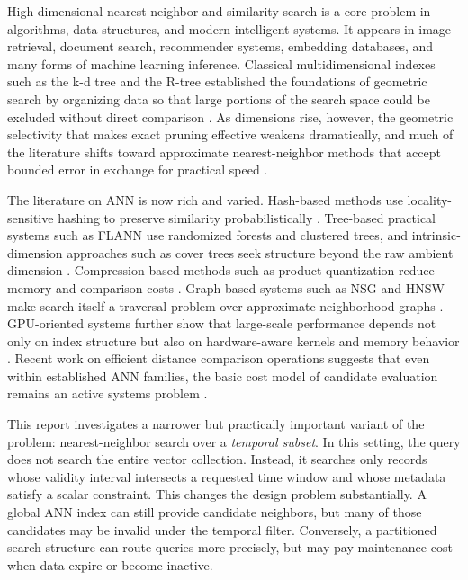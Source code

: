 \documentclass[sigconf,nonacm]{acmart}
\begin{document}
High-dimensional nearest-neighbor and similarity search is a core problem in algorithms, data structures, and modern intelligent systems. It appears in image retrieval, document search, recommender systems, embedding databases, and many forms of machine learning inference. Classical multidimensional indexes such as the k-d tree and the R-tree established the foundations of geometric search by organizing data so that large portions of the search space could be excluded without direct comparison \cite{bentley1975,guttman1984}. As dimensions rise, however, the geometric selectivity that makes exact pruning effective weakens dramatically, and much of the literature shifts toward approximate nearest-neighbor methods that accept bounded error in exchange for practical speed \cite{indyk1998,gionis1999,andoni2018}.

The literature on ANN is now rich and varied. Hash-based methods use locality-sensitive hashing to preserve similarity probabilistically \cite{indyk1998,gionis1999}. Tree-based practical systems such as FLANN use randomized forests and clustered trees, and intrinsic-dimension approaches such as cover trees seek structure beyond the raw ambient dimension \cite{muja2014,beygelzimer2006}. Compression-based methods such as product quantization reduce memory and comparison costs \cite{jegou2011}. Graph-based systems such as NSG and HNSW make search itself a traversal problem over approximate neighborhood graphs \cite{fu2019,malkov2020}. GPU-oriented systems further show that large-scale performance depends not only on index structure but also on hardware-aware kernels and memory behavior \cite{johnson2021}. Recent work on efficient distance comparison operations suggests that even within established ANN families, the basic cost model of candidate evaluation remains an active systems problem \cite{gao2023}.

This report investigates a narrower but practically important variant of the problem: nearest-neighbor search over a \emph{temporal subset}. In this setting, the query does not search the entire vector collection. Instead, it searches only records whose validity interval intersects a requested time window and whose metadata satisfy a scalar constraint. This changes the design problem substantially. A global ANN index can still provide candidate neighbors, but many of those candidates may be invalid under the temporal filter. Conversely, a partitioned search structure can route queries more precisely, but may pay maintenance cost when data expire or become inactive.
\end{document}
